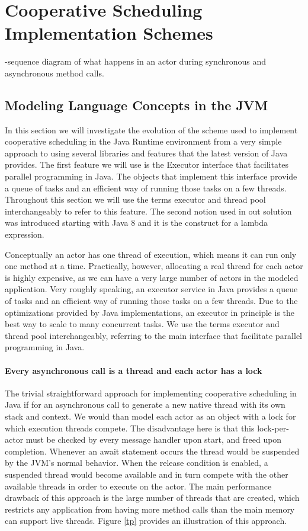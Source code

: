 \section{Cooperative Scheduling Implementation Schemes}
\label{scheme}
-sequence diagram of what happens in an actor during synchronous and asynchronous method calls.

\subsection{Modeling Language Concepts in the JVM}
In this section we will investigate the evolution of the scheme used to implement cooperative scheduling in the Java Runtime environment from a very simple approach to using several libraries and features that the latest version of Java provides. The first feature we will use is the Executor interface \cite{execserv} that facilitates parallel programming in Java. The objects that implement this interface provide a queue of tasks and an efficient way of running those tasks on a few threads. Throughout this section we will use the terms executor and thread pool interchangeably to refer to this feature. The second notion used in out solution was introduced starting with Java 8 and it is the construct for a lambda expression.



Conceptually an actor has one thread of execution, which means it can run only one method at a time. Practically, however, allocating a real thread for each actor is highly expensive, as we can have a very large number of actors in the modeled application. Very roughly speaking, an executor service in Java provides a queue of tasks and an efficient way of running those tasks on a few threads. Due to the optimizations provided by Java implementations, an executor in principle is the best way to scale to many concurrent tasks. We use the terms executor and thread pool interchangeably, referring to the main interface \cite{execserv} that facilitate parallel programming in Java. 

\paragraph{Every asynchronous call is a thread and each actor has a lock }
The trivial straightforward approach for implementing cooperative scheduling in Java if for an asynchronous call to generate a new native thread with its own stack and context. We would than model each actor as an object with a lock for which execution threads compete. The disadvantage here is that this lock-per-actor must be checked by every message handler upon start, and freed upon completion. Whenever an await statement occurs the thread would be suspended by the JVM's normal behavior. When the release condition is enabled, a suspended thread would become available and in turn compete with the other available threads in order to execute on the actor. The main performance drawback of this approach is the large number of threads that are created, which restricts any application from having more method calls than the main memory can support live threads. Figure \ref{tp} provides an illustration of this approach.

